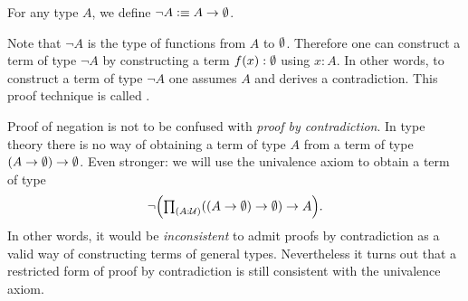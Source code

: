 \begin{defn}
For any type $A$, we define $\neg A\vcentcolon\equiv A\to \emptyset$.
\end{defn}

Note that $\neg A$ is the type of functions from $A$ to $\emptyset$. Therefore one can construct a term of type $\neg A$ by constructing a term $f(x):\emptyset$ using $x:A$. In other words, to construct a term of type $\neg A$ one assumes $A$ and derives a contradiction. This proof technique is called .

Proof of negation is not to be confused with \emph{proof by contradiction}. In type theory there is no way of obtaining a term of type $A$ from a term of type $(A\to \emptyset)\to\emptyset$. Even stronger: we will use the univalence axiom to obtain a term of type
\begin{equation*}
  \neg\Big(\prd{A:\UU}((A\to\emptyt)\to\emptyt)\to A\Big).
\end{equation*}
In other words, it would be \emph{inconsistent} to admit proofs by contradiction as a valid way of constructing terms of general types. Nevertheless it turns out that a restricted form of proof by contradiction is still consistent with the univalence axiom.

